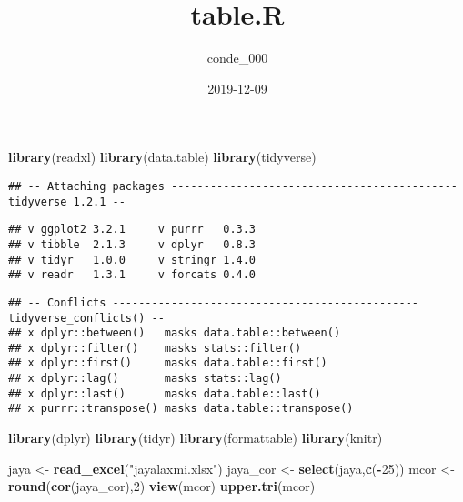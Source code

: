 \documentclass[
]{article}
\title{table.R}
\author{conde\_000}
\date{2019-12-09}
\newenvironment{Shaded}{\begin{snugshade}}{\end{snugshade}}
\newcommand{\DecValTok}[1]{\textcolor[rgb]{0.00,0.00,0.81}{#1}}
\newcommand{\KeywordTok}[1]{\textcolor[rgb]{0.13,0.29,0.53}{\textbf{#1}}}
\newcommand{\NormalTok}[1]{#1}
\newcommand{\OperatorTok}[1]{\textcolor[rgb]{0.81,0.36,0.00}{\textbf{#1}}}
\newcommand{\StringTok}[1]{\textcolor[rgb]{0.31,0.60,0.02}{#1}}
\begin{document}
\maketitle

\begin{Shaded}
\begin{Highlighting}[]
\KeywordTok{library}\NormalTok{(readxl)}
\KeywordTok{library}\NormalTok{(data.table)}
\KeywordTok{library}\NormalTok{(tidyverse)}
\end{Highlighting}
\end{Shaded}

\begin{verbatim}
## -- Attaching packages -------------------------------------------- tidyverse 1.2.1 --
\end{verbatim}

\begin{verbatim}
## v ggplot2 3.2.1     v purrr   0.3.3
## v tibble  2.1.3     v dplyr   0.8.3
## v tidyr   1.0.0     v stringr 1.4.0
## v readr   1.3.1     v forcats 0.4.0
\end{verbatim}

\begin{verbatim}
## -- Conflicts ----------------------------------------------- tidyverse_conflicts() --
## x dplyr::between()   masks data.table::between()
## x dplyr::filter()    masks stats::filter()
## x dplyr::first()     masks data.table::first()
## x dplyr::lag()       masks stats::lag()
## x dplyr::last()      masks data.table::last()
## x purrr::transpose() masks data.table::transpose()
\end{verbatim}

\begin{Shaded}
\begin{Highlighting}[]
\KeywordTok{library}\NormalTok{(dplyr)}
\KeywordTok{library}\NormalTok{(tidyr)}
\KeywordTok{library}\NormalTok{(formattable)}
\KeywordTok{library}\NormalTok{(knitr)}

\NormalTok{jaya <-}\StringTok{ }\KeywordTok{read_excel}\NormalTok{(}\StringTok{"jayalaxmi.xlsx"}\NormalTok{)}
\NormalTok{jaya_cor <-}\StringTok{ }\KeywordTok{select}\NormalTok{(jaya,}\KeywordTok{c}\NormalTok{(}\OperatorTok{-}\DecValTok{25}\NormalTok{))}
\NormalTok{mcor <-}\StringTok{ }\KeywordTok{round}\NormalTok{(}\KeywordTok{cor}\NormalTok{(jaya_cor),}\DecValTok{2}\NormalTok{)}
\KeywordTok{view}\NormalTok{(mcor)}
\KeywordTok{upper.tri}\NormalTok{(mcor)}
\end{Highlighting}
\end{Shaded}
\end{document}
